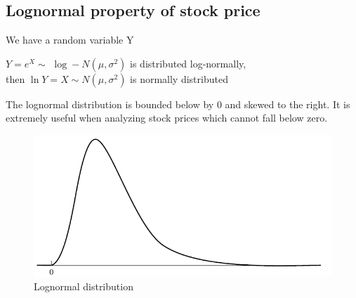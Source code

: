 \subsection{Lognormal property of stock price}
We have a random variable Y
\begin{center}
	$Y=e^X\sim$ $\log-N(\mu, \sigma^2)$ is distributed log-normally,\\ [0.3cm]
	then $\ln Y=X\sim N(\mu, \sigma^2)$ is normally distributed
\end{center}
The lognormal distribution is bounded below by $0$ and skewed to the right. It is extremely useful when analyzing stock prices which cannot fall below zero.
\begin{figure}[htp]
	\begin{center}
		\includegraphics[scale=0.5]{figure7}
	\end{center}
	\label{reffig7}
	\caption{Lognormal distribution}
\end{figure}\\

